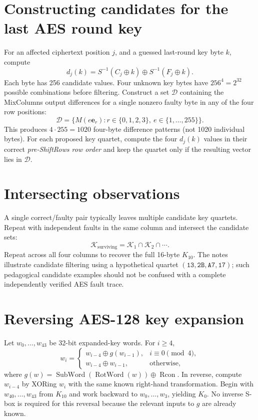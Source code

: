 \documentclass[11pt,a4paper]{report}
\newcommand{\hex}[1]{\texttt{#1}}
\newcommand{\xor}{\mathbin{\oplus}}
\begin{document}
\section{Constructing candidates for the last AES round key}
For an affected ciphertext position \(j\), and a guessed last-round key byte \(k\), compute
\[d_j(k)=S^{-1}(C_j\xor k)\xor S^{-1}(F_j\xor k).\]
Each byte has 256 candidate values. Four unknown key bytes have \(256^4=2^{32}\) possible combinations before filtering.
Construct a set \(\mathcal D\) containing the MixColumns output differences for a single nonzero faulty byte in any of the four row positions:
\[\mathcal D=\{M(e\mathbf e_r):r\in\{0,1,2,3\},\ e\in\{1,\ldots,255\}\}.\]
This produces \(4\cdot255=1020\) four-byte difference patterns (not 1020 individual bytes). For each proposed key quartet, compute the four \(d_j(k)\) values in their correct \emph{pre-ShiftRows row order} and keep the quartet only if the resulting vector lies in \(\mathcal D\).
\section{Intersecting observations}
A single correct/faulty pair typically leaves multiple candidate key quartets. Repeat with independent faults in the same column and intersect the candidate sets:
\[\mathcal K_{\mathrm{surviving}}=\mathcal K_1\cap\mathcal K_2\cap\cdots.\]
Repeat across all four columns to recover the full 16-byte \(K_{10}\). The notes illustrate candidate filtering using a hypothetical quartet \((\hex{13},\hex{2B},\hex{A7},\hex{17})\); such pedagogical candidate examples should not be confused with a complete independently verified AES fault trace.
\section{Reversing AES-128 key expansion}
Let \(w_0,\ldots,w_{43}\) be 32-bit expanded-key words. For \(i\ge4\),
\[w_i=\begin{cases}w_{i-4}\xor g(w_{i-1}),&i\equiv0\pmod4,\\w_{i-4}\xor w_{i-1},&\text{otherwise},\end{cases}\]
where \(g(w)=\operatorname{SubWord}(\operatorname{RotWord}(w))\xor\operatorname{Rcon}\). In reverse, compute \(w_{i-4}\) by XORing \(w_i\) with the same known right-hand transformation. Begin with \(w_{40},\ldots,w_{43}\) from \(K_{10}\) and work backward to \(w_0,\ldots,w_3\), yielding \(K_0\). No inverse S-box is required for this reversal because the relevant inputs to \(g\) are already known.
\end{document}
